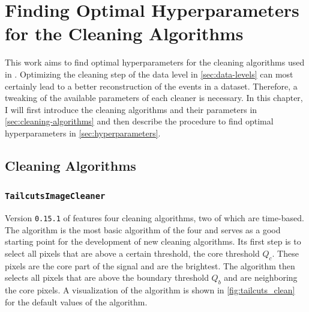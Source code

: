 \chapter{Finding Optimal Hyperparameters for the Cleaning Algorithms}
\label{ch:finding-hyperparams}

This work aims to find optimal hyperparameters for the cleaning algorithms used in \ctapipe{}.
Optimizing the cleaning step of the \dlo{} data level in \autoref{sec:data-levels} can most certainly lead to a better
reconstruction of the events in a dataset. Therefore, a tweaking of the available parameters of each
cleaner is necessary. In this chapter, I will first introduce the cleaning algorithms and their parameters
in \autoref{sec:cleaning-algorithms} and then describe the procedure to find optimal hyperparameters
in \autoref{sec:hyperparameters}.
\vspace{-0.5cm}
\section{Cleaning Algorithms}
\label{sec:cleaning-algorithms}
\vspace{-0.5cm}
\subsection{\texttt{TailcutsImageCleaner}}
\vspace{-0.5cm}
Version \texttt{0.15.1} of \ctapipe{} features four cleaning algorithms, two of which are time-based.
The \tailcuts{} algorithm is the most basic algorithm of the four and serves as a good
starting point for the development of new cleaning algorithms. Its first step is to select all
pixels that are above a certain threshold, the core threshold \(Q_c\). These
pixels are the core part of the signal and are the brightest. The \tailcuts{} algorithm
then selects all pixels that are above the boundary threshold \(Q_b\) and are neighboring
the core pixels. A visualization of the algorithm is shown in \autoref{fig:tailcuts_clean} for the
default values of the algorithm.

